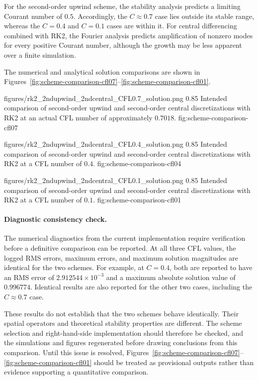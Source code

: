 For the second-order upwind scheme, the stability analysis predicts a limiting Courant number of $0.5$. Accordingly, the $C\approx0.7$ case lies outside its stable range, whereas the $C=0.4$ and $C=0.1$ cases are within it. For central differencing combined with RK2, the Fourier analysis predicts amplification of nonzero modes for every positive Courant number, although the growth may be less apparent over a finite simulation.

The numerical and analytical solution comparisons are shown in Figures~\ref{fig:scheme-comparison-cfl07}--\ref{fig:scheme-comparison-cfl01}.

\resultfigure
    {figures/rk2_2ndupwind_2ndcentral_CFL0.7_solution.png}
    {0.85}
    {Intended comparison of second-order upwind and second-order central discretizations with RK2 at an actual CFL number of approximately $0.7018$.}
    {fig:scheme-comparison-cfl07}

\resultfigure
    {figures/rk2_2ndupwind_2ndcentral_CFL0.4_solution.png}
    {0.85}
    {Intended comparison of second-order upwind and second-order central discretizations with RK2 at a CFL number of $0.4$.}
    {fig:scheme-comparison-cfl04}

\resultfigure
    {figures/rk2_2ndupwind_2ndcentral_CFL0.1_solution.png}
    {0.85}
    {Intended comparison of second-order upwind and second-order central discretizations with RK2 at a CFL number of $0.1$.}
    {fig:scheme-comparison-cfl01}

\paragraph{Diagnostic consistency check.}
The numerical diagnostics from the current implementation require verification before a definitive comparison can be reported. At all three CFL values, the logged RMS errors, maximum errors, and maximum solution magnitudes are identical for the two schemes. For example, at $C=0.4$, both are reported to have an RMS error of $2.912544\times10^{-3}$ and a maximum absolute solution value of $0.996774$. Identical results are also reported for the other two cases, including the $C\approx0.7$ case.

These results do not establish that the two schemes behave identically. Their spatial operators and theoretical stability properties are different. The scheme selection and right-hand-side implementation should therefore be checked, and the simulations and figures regenerated before drawing conclusions from this comparison. Until this issue is resolved, Figures~\ref{fig:scheme-comparison-cfl07}--\ref{fig:scheme-comparison-cfl01} should be treated as provisional outputs rather than evidence supporting a quantitative comparison.

